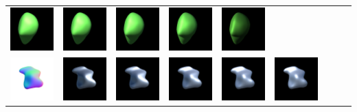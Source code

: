 \begin{center}
\begin{longtable}{@{}c@{}c@{}c@{}c@{}c@{}c@{}c@{}c@{}c@{}}
\includegraphics[width=0.1\linewidth]{training/28_3.png} & \includegraphics[width=0.1\linewidth]{training/28_4.png} &
\includegraphics[width=0.1\linewidth]{training/28_5.png} & \includegraphics[width=0.1\linewidth]{training/28_6.png} &
\includegraphics[width=0.1\linewidth]{training/28_7.png} \\
\includegraphics[width=0.1\linewidth]{training/29_gt.png} & \includegraphics[width=0.1\linewidth]{training/29_0.png} &
\includegraphics[width=0.1\linewidth]{training/29_1.png} & \includegraphics[width=0.1\linewidth]{training/29_2.png} &
\includegraphics[width=0.1\linewidth]{training/29_3.png} & \includegraphics[width=0.1\linewidth]{training/29_4.png} &

\end{longtable}
\end{center}
